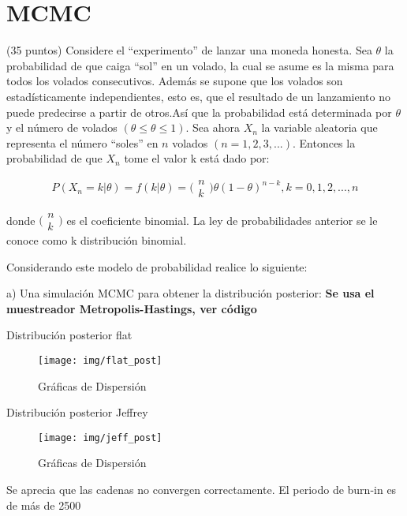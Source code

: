 \documentclass[11pt]{article}
\begin{document}
\section{MCMC}
\noindent (35 puntos) Considere el ``experimento'' de lanzar una moneda honesta. Sea $\theta$ la probabilidad de que caiga “sol” en un volado, la cual se asume es la misma para todos los volados consecutivos. Además se supone que los volados son estadísticamente independientes, esto es, que el resultado de un lanzamiento no puede predecirse a partir de otros.Así que la probabilidad está determinada por $\theta$ y el número de volados $(\theta \leq \theta \leq 1)$. Sea ahora $X_n$ la variable aleatoria que representa el número ``soles'' en $n$ volados $(n = 1, 2, 3, . . .)$. Entonces la probabilidad de que $X_n$ tome el valor k está dado por:

$$ P(X_n=k | \theta)=f(k|\theta)= \Big(\!
    \begin{array}{c}
      n \\
      k
    \end{array}
  \! \Big) \theta (1-\theta)^{n-k}, k=0,1,2,...,n 	$$
  
\noindent donde $\Big(\!\begin{array}{c}
      n \\
      k
    \end{array}
  \! \Big)$ es el coeficiente binomial. La ley de probabilidades anterior se le conoce como k distribución binomial. 

\noindent Considerando este modelo de probabilidad realice lo siguiente:

\noindent a) Una simulación MCMC para obtener la distribución posterior:
\noindent \textbf{ Se usa el muestreador Metropolis-Hastings, ver código }

Distribución posterior flat
\begin{figure} [H]
	\texttt{[image: img/flat\_post]}
	\caption[]{Gráficas de Dispersión}
\label{fig:fig1}
\end{figure}

Distribución posterior Jeffrey
\begin{figure} [H]
	\texttt{[image: img/jeff\_post]}
	\caption[]{Gráficas de Dispersión}
\label{fig:fig1}
\end{figure}

Se aprecia que las cadenas no convergen correctamente. El periodo de burn-in es de más de 2500
\end{document}

